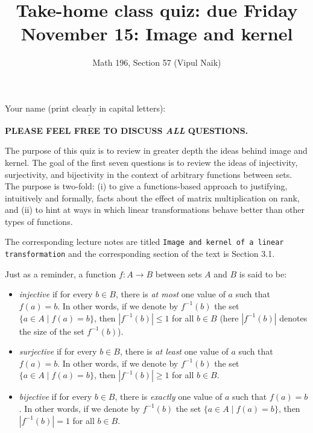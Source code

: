 \documentclass[10pt]{amsart}
\title{Take-home class quiz: due Friday November 15: Image and kernel}
\author{Math 196, Section 57 (Vipul Naik)}
\begin{document}
\maketitle

Your name (print clearly in capital letters): $\underline{\qquad\qquad\qquad\qquad\qquad\qquad\qquad\qquad\qquad\qquad}$

{\bf PLEASE FEEL FREE TO DISCUSS {\em ALL} QUESTIONS.}

The purpose of this quiz is to review in greater depth the ideas
behind image and kernel. The goal of the first seven questions is to
review the ideas of injectivity, surjectivity, and bijectivity in the
context of arbitrary functions between sets. The purpose is two-fold:
(i) to give a functions-based approach to justifying, intuitively and
formally, facts about the effect of matrix multiplication on rank, and
(ii) to hint at ways in which linear transformations behave better
than other types of functions.

The corresponding lecture notes are titled {\tt Image and kernel of a
  linear transformation} and the corresponding section of the text is
Section 3.1.

Just as a reminder, a function $f:A \to B$ between sets $A$ and $B$ is
said to be:

\begin{itemize}
\item {\em injective} if for every $b \in B$, there is {\em at most}
  one value of $a$ such that $f(a) = b$. In other words, if we denote
  by $f^{-1}(b)$ the set $\{ a \in A \mid f(a) = b \}$, then
  $|f^{-1}(b)| \le 1$ for all $b \in B$ (here $|f^{-1}(b)|$ denotes
  the size of the set $f^{-1}(b)$).
\item {\em surjective} if for every $b \in B$, there is {\em at least}
  one value of $a$ such that $f(a) = b$. In other words, if we denote
  by $f^{-1}(b)$ the set $\{ a \in A \mid f(a) = b \}$, then
  $|f^{-1}(b)| \ge 1$ for all $b \in B$.
\item {\em bijective} if for every $b \in B$, there is {\em exactly}
  one value of $a$ such that $f(a) = b$. In other words, if we denote
  by $f^{-1}(b)$ the set $\{ a \in A \mid f(a) = b \}$, then
  $|f^{-1}(b)| = 1$ for all $b \in B$.
\end{itemize}
\end{document}
